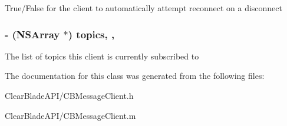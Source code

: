 True/\+False for the client to automatically attempt reconnect on a disconnect \hypertarget{interface_c_b_message_client_a41081dc92c32ef8aa7ab364463825398}{
\subsubsection[{topics}]{\setlength{\rightskip}{0pt plus 5cm}-\/ (N\+S\+Array $\ast$) topics\hspace{0.3cm}{\ttfamily [read]}, {\ttfamily [atomic]}, {\ttfamily [assign]}}}\label{interface_c_b_message_client_a41081dc92c32ef8aa7ab364463825398}
The list of topics this client is currently subscribed to 

The documentation for this class was generated from the following files\+:\begin{DoxyCompactItemize}
\item 
Clear\+Blade\+A\+P\+I/C\+B\+Message\+Client.\+h\item 
Clear\+Blade\+A\+P\+I/C\+B\+Message\+Client.\+m\end{DoxyCompactItemize}
